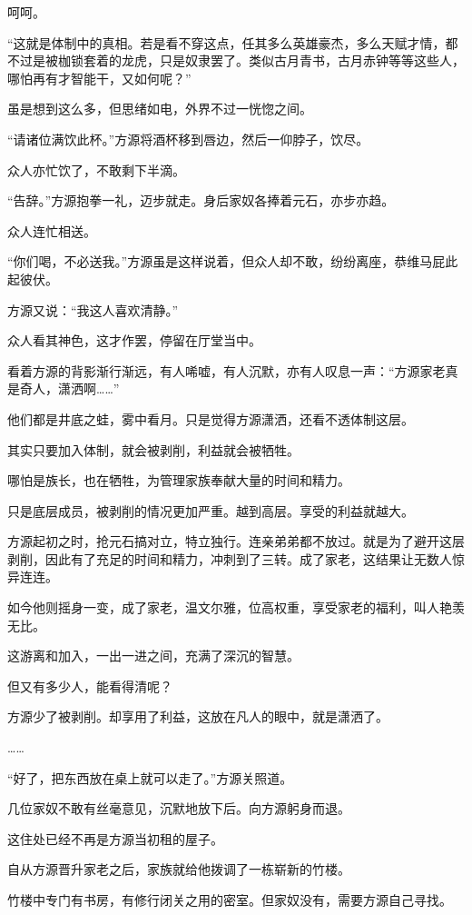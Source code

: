 \begin{this_body}
呵呵。

“这就是体制中的真相。若是看不穿这点，任其多么英雄豪杰，多么天赋才情，都不过是被枷锁套着的龙虎，只是奴隶罢了。类似古月青书，古月赤钟等等这些人，哪怕再有才智能干，又如何呢？”

虽是想到这么多，但思绪如电，外界不过一恍惚之间。

“请诸位满饮此杯。”方源将酒杯移到唇边，然后一仰脖子，饮尽。

众人亦忙饮了，不敢剩下半滴。

“告辞。”方源抱拳一礼，迈步就走。身后家奴各捧着元石，亦步亦趋。

众人连忙相送。

“你们喝，不必送我。”方源虽是这样说着，但众人却不敢，纷纷离座，恭维马屁此起彼伏。

方源又说：“我这人喜欢清静。”

众人看其神色，这才作罢，停留在厅堂当中。

看着方源的背影渐行渐远，有人唏嘘，有人沉默，亦有人叹息一声：“方源家老真是奇人，潇洒啊……”

他们都是井底之蛙，雾中看月。只是觉得方源潇洒，还看不透体制这层。

其实只要加入体制，就会被剥削，利益就会被牺牲。

哪怕是族长，也在牺牲，为管理家族奉献大量的时间和精力。

只是底层成员，被剥削的情况更加严重。越到高层。享受的利益就越大。

方源起初之时，抢元石搞对立，特立独行。连亲弟弟都不放过。就是为了避开这层剥削，因此有了充足的时间和精力，冲刺到了三转。成了家老，这结果让无数人惊异连连。

如今他则摇身一变，成了家老，温文尔雅，位高权重，享受家老的福利，叫人艳羡无比。

这游离和加入，一出一进之间，充满了深沉的智慧。

但又有多少人，能看得清呢？

方源少了被剥削。却享用了利益，这放在凡人的眼中，就是潇洒了。

……

“好了，把东西放在桌上就可以走了。”方源关照道。

几位家奴不敢有丝毫意见，沉默地放下后。向方源躬身而退。

这住处已经不再是方源当初租的屋子。

自从方源晋升家老之后，家族就给他拨调了一栋崭新的竹楼。

竹楼中专门有书房，有修行闭关之用的密室。但家奴没有，需要方源自己寻找。


\end{this_body}
